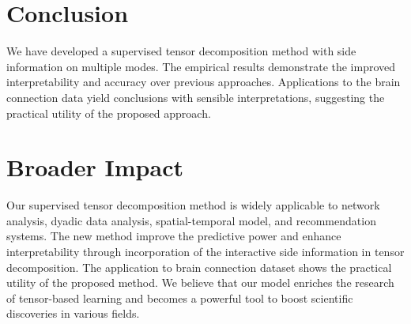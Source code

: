 \documentclass{article}
\theoremstyle{definition}
\theoremstyle{definition}
\begin{document}
\section{Conclusion}
\vspace{-.2cm}
We have developed a supervised tensor decomposition method with side information on multiple modes. The empirical results demonstrate the improved interpretability and accuracy over previous approaches. Applications to the brain connection data yield conclusions with sensible interpretations, suggesting the practical utility of the proposed approach.

\newpage 
\section*{Broader Impact}

Our supervised tensor decomposition method is widely applicable to network analysis, dyadic data analysis, spatial-temporal model, and recommendation systems.
The new method improve the predictive power and enhance interpretability through incorporation of the interactive side information in tensor decomposition.
The application to  brain connection dataset  shows the practical utility of the proposed method.
 We believe that our model enriches the research of tensor-based learning and becomes a powerful tool to boost scientific discoveries in various fields. 





\end{document}
